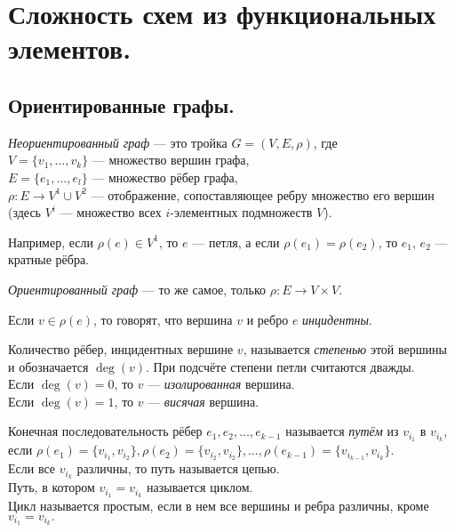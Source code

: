 \section{Сложность схем из функциональных элементов.}
\subsection{Ориентированные графы.}
\begin{df} 
\textit{Неориентированный граф} --- это тройка $G = (V, E, \rho)$, где\\
$V = \{v_1, \dots, v_k\}$ --- множество вершин графа,\\
$E = \{e_1, \dots, e_l\}$ --- множество рёбер графа,\\ 
$\rho\colon E \rightarrow V^1 \cup V^2$ --- отображение, сопоставляющее ребру множество его вершин (здесь $V^i$ --- множество всех $i$-элементных подмножеств $V$).
\end{df}
\noindent Например, если $\rho(e) \in V^1$, то $e$ --- петля, а если $\rho(e_1) = \rho(e_2)$, то $e_1,\,e_2$ --- кратные рёбра.

\begin{df}
\textit{Ориентированный граф} --- то же самое, только $\rho\colon E \rightarrow V \times V$.
\end{df}

\begin{df}
Если $v\in \rho(e)$, то говорят, что вершина $v$ и ребро $e$ \textit{инцидентны}.
\end{df}

\begin{df}
Количество рёбер, инцидентных вершине $v$, называется \textit{степенью} этой вершины и обозначается $\deg(v)$. При подсчёте степени петли считаются дважды.\\
Если $\deg(v) = 0$, то $v$ --- \textit{изолированная} вершина.\\
Если $\deg(v) = 1$, то $v$ --- \textit{висячая} вершина.
\end{df}

\begin{df}
Конечная последовательность рёбер $e_1, e_2, \ldots, e_{k-1}$ называется \textit{путём} из $v_{i_1}$ в $v_{i_k}$, если $\rho(e_1) = \{v_{i_1}, v_{i_2}\},\rho(e_2) = \{v_{i_2}, v_{i_2}\} , \ldots, \rho(e_{k-1}) = \{v_{i_{k-1}}, v_{i_k}\}$.\\
Если все $v_{i_k}$ различны, то путь называется цепью.\\
Путь, в котором $v_{i_1} = v_{i_k}$ называется циклом.\\
Цикл называется простым, если в нем все вершины и ребра различны, кроме $v_{i_1} = v_{i_k}.$
\end{df}

